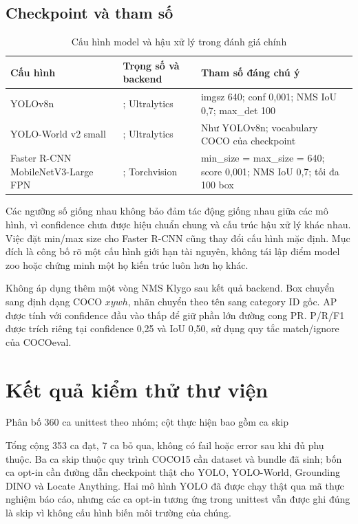 \subsection{Checkpoint và tham số}
\begin{table}[H]\centering\small
\caption{Cấu hình model và hậu xử lý trong đánh giá chính}
\begin{tabularx}{\textwidth}{p{2.6cm}YY}
\toprule Cấu hình & Trọng số và backend & Tham số đáng chú ý \\\midrule
YOLOv8n & ; Ultralytics & imgsz 640; conf 0,001; NMS IoU 0,7; max\_det 100 \\
YOLO-World v2 small & ; Ultralytics & Như YOLOv8n; vocabulary COCO của checkpoint \\
Faster R-CNN MobileNetV3-Large FPN & ; Torchvision & min\_size = max\_size = 640; score 0,001; NMS IoU 0,7; tối đa 100 box \\
\bottomrule
\end{tabularx}
\end{table}
Các ngưỡng số giống nhau không bảo đảm tác động giống nhau giữa các mô hình, vì confidence chưa được hiệu chuẩn chung và cấu trúc hậu xử lý khác nhau. Việc đặt min/max size cho Faster R-CNN cũng thay đổi cấu hình mặc định. Mục đích là công bố rõ một cấu hình giới hạn tài nguyên, không tái lập điểm model zoo hoặc chứng minh một họ kiến trúc luôn hơn họ khác.

Không áp dụng thêm một vòng NMS Klygo sau kết quả backend. Box chuyển sang định dạng COCO $xywh$, nhãn chuyển theo tên sang category ID gốc. AP được tính với confidence đầu vào thấp để giữ phần lớn đường cong PR. P/R/F1 được trích riêng tại confidence 0,25 và IoU 0,50, sử dụng quy tắc match/ignore của COCOeval.

\section{Kết quả kiểm thử thư viện}
\begin{table}[H]\centering\small
\caption{Phân bố 360 ca unittest theo nhóm; cột thực hiện bao gồm ca skip}

\label{tab:tests}
\end{table}
Tổng cộng 353 ca đạt, 7 ca bỏ qua, không có fail hoặc error sau khi đủ phụ thuộc. Ba ca skip thuộc quy trình COCO15 cần dataset và bundle đã sinh; bốn ca opt-in cần đường dẫn checkpoint thật cho YOLO, YOLO-World, Grounding DINO và Locate Anything. Hai mô hình YOLO đã được chạy thật qua mã thực nghiệm báo cáo, nhưng các ca opt-in tương ứng trong unittest vẫn được ghi đúng là skip vì không cấu hình biến môi trường của chúng.

